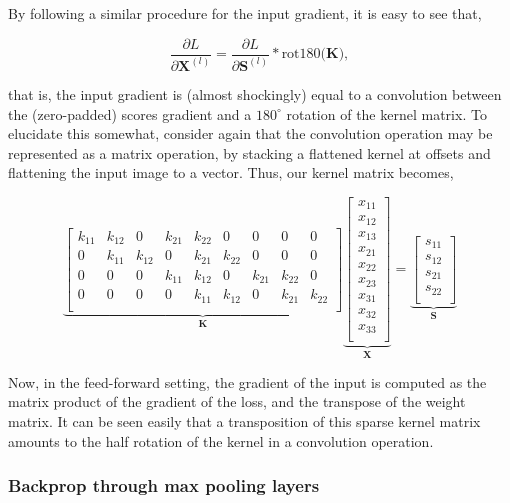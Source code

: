 \documentclass[11pt]{amsart}
\begin{document}
By following a similar procedure for the input gradient, it is easy to see that,

$$\frac{\partial L}{\partial \mathbf{X}^{(l)}} = \frac{\partial L}{\partial \mathbf{S}^{(l)}} * \text{rot180}\big(\mathbf{K}\big),$$

that is, the input gradient is (almost shockingly) equal to a convolution between the (zero-padded) scores gradient and a $180^{\circ}$ rotation of the kernel matrix. To elucidate this somewhat, consider again that the convolution operation may be represented as a matrix operation, by stacking a flattened kernel at offsets and flattening the input image to a vector. Thus, our kernel matrix becomes,

$$
\underbrace{\begin{bmatrix}
k_{11} & k_{12} & 0 & k_{21} & k_{22} & 0 & 0 & 0 & 0 \\
0 & k_{11} & k_{12} & 0 & k_{21} & k_{22} & 0 & 0 & 0 \\
0 & 0 & 0 & k_{11} & k_{12} & 0 & k_{21} & k_{22} & 0 \\
0 & 0 & 0 & 0 & k_{11} & k_{12} & 0 & k_{21} & k_{22} \\
\end{bmatrix}}_{\mathbf{K}}
\underbrace{\begin{bmatrix}
x_{11} \\
x_{12} \\
x_{13} \\
x_{21} \\
x_{22} \\
x_{23} \\
x_{31} \\
x_{32} \\
x_{33} \\
\end{bmatrix}}_{\mathbf{X}} =
\underbrace{\begin{bmatrix}
s_{11} \\
s_{12} \\
s_{21} \\
s_{22} \\
\end{bmatrix}}_{\mathbf{S}}
$$

Now, in the feed-forward setting, the gradient of the input is computed as the matrix product of the gradient of the loss, and the transpose of the weight matrix. It can be seen easily that a transposition of this sparse kernel matrix amounts to the half rotation of the kernel in a convolution operation.

\subsubsection{Backprop through max pooling layers}
\end{document}
